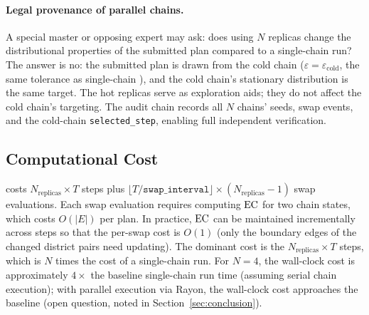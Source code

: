 \paragraph{Legal provenance of parallel chains.}
A special master or opposing expert may ask: does using $N$ replicas change the
distributional properties of the submitted plan compared to a single-chain
\fr{} run?
The answer is no: the submitted plan is drawn from the cold chain
($\varepsilon = \varepsilon_{\text{cold}}$, the same tolerance as single-chain
\fr{}), and the cold chain's stationary distribution is the same \fr{} target.
The hot replicas serve as exploration aids; they do not affect the cold chain's
targeting.
The audit chain records all $N$ chains' seeds, swap events, and the cold-chain
\texttt{selected\_step}, enabling full independent verification.

\subsection{Computational Cost}

\pt{} costs $N_{\mathrm{replicas}} \times T$ \fr{} steps plus
$\lfloor T / \mathtt{swap\_interval} \rfloor \times (N_{\mathrm{replicas}}-1)$
swap evaluations.
Each swap evaluation requires computing $\mathrm{EC}$ for two chain states, which costs
$O(|E|)$ per plan.
In practice, $\mathrm{EC}$ can be maintained incrementally across \fr{} steps so that
the per-swap cost is $O(1)$ (only the boundary edges of the changed district
pairs need updating).
The dominant cost is the $N_{\mathrm{replicas}} \times T$ \fr{} steps, which is
$N$ times the cost of a single-chain run.
For $N=4$, the wall-clock cost is approximately $4\times$ the baseline single-chain
run time (assuming serial chain execution); with parallel execution via Rayon,
the wall-clock cost approaches the baseline (open question, noted in
Section~\ref{sec:conclusion}).
